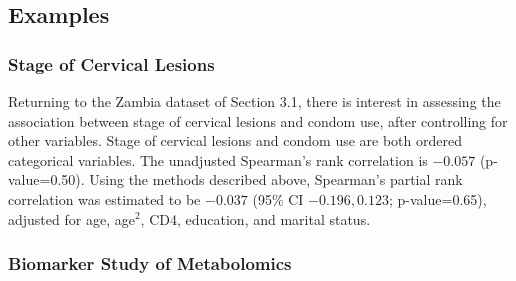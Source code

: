\documentclass[12pt, usenatbib]{article}
\begin{document}
\subsection{Examples}

\subsubsection{Stage of Cervical Lesions}  

Returning to the Zambia dataset of Section 3.1, there is interest in assessing the association between stage of cervical lesions and condom use, after controlling for other variables.  Stage of cervical lesions and condom use are both ordered categorical variables.  The unadjusted Spearman's rank correlation is $-0.057$ (p-value=0.50).  Using the methods described above, Spearman's partial rank correlation was estimated to be $-0.037$ (95\% CI $-0.196, 0.123$; p-value=0.65), adjusted for age, age$^2$, CD4, education, and marital status.  



\subsubsection{Biomarker Study of Metabolomics}
\end{document}
